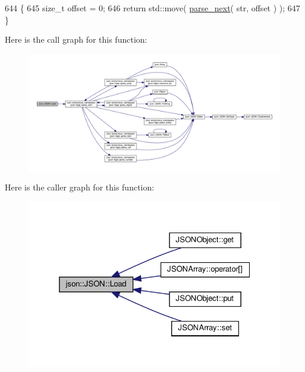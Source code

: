 \begin{DoxyCode}
644                                           \{
645     \textcolor{keywordtype}{size\_t} offset = 0;
646     \textcolor{keywordflow}{return} std::move( \mbox{\hyperlink{namespacejson_1_1anonymous__namespace_02json_8hpp_03_acd55b945d1583038db8633516df7cf3f}{parse\_next}}( str, offset ) );
647 \}
\end{DoxyCode}
Here is the call graph for this function\+:
\nopagebreak
\begin{figure}[H]
\begin{center}
\leavevmode
\includegraphics[width=350pt]{classjson_1_1_j_s_o_n_a799ab1cc68cb6e2a41ec948a9a2ecc37_cgraph}
\end{center}
\end{figure}
Here is the caller graph for this function\+:
\nopagebreak
\begin{figure}[H]
\begin{center}
\leavevmode
\includegraphics[width=325pt]{classjson_1_1_j_s_o_n_a799ab1cc68cb6e2a41ec948a9a2ecc37_icgraph}
\end{center}
\end{figure}
\mbox{\label{classjson_1_1_j_s_o_n_aa679dc348ed9711357c315a461b65957}} 
